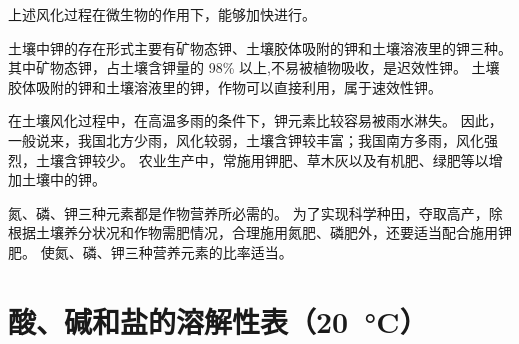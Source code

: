 上述风化过程在微生物的作用下，能够加快进行。

土壤中钾的存在形式主要有矿物态钾、土壤胶体吸附的钾和土壤溶液里的钾三种。
其中矿物态钾，占土壤含钾量的 98\% 以上,不易被植物吸收，是迟效性钾。
土壤胶体吸附的钾和土壤溶液里的钾，作物可以直接利用，属于速效性钾。

在土壤风化过程中，在高温多雨的条件下，钾元素比较容易被雨水淋失。
因此，一般说来，我国北方少雨，风化较弱，土壤含钾较丰富；我国南方多雨，风化强烈，土壤含钾较少。
农业生产中，常施用钾肥、草木灰以及有机肥、绿肥等以增加土壤中的钾。

氮、磷、钾三种元素都是作物营养所必需的。
为了实现科学种田，夺取高产，除根据土壤养分状况和作物需肥情况，合理施用氮肥、磷肥外，还要适当配合施用钾肥。
使氮、磷、钾三种营养元素的比率适当。


\chapter{酸、碱和盐的溶解性表（\qty{20}{\celsius}）}
